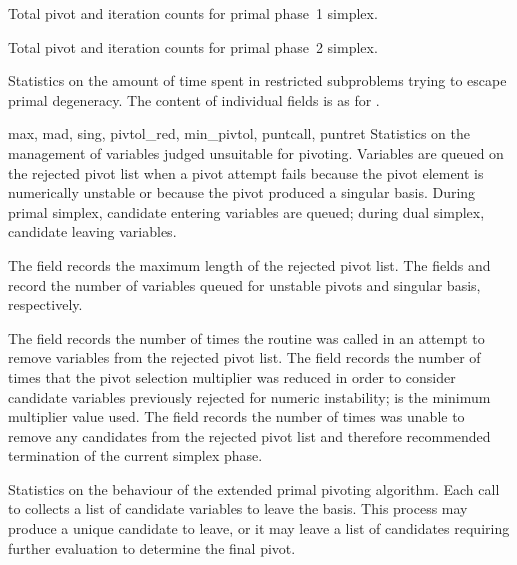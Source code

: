 \begin{codedoc}
  \item{}
  Total pivot and iteration counts for primal phase~1 simplex.

  \item{}
  Total pivot and iteration counts for primal phase~2 simplex.

  \item{}
  Statistics on the amount of time spent in restricted subproblems trying to
  escape primal degeneracy.
  The content of individual fields is as for .

  \item{}%
	      {max, mad, sing, pivtol_red, min_pivtol, puntcall, puntret}
  Statistics on the management of variables judged unsuitable for pivoting.
  Variables are queued on the rejected pivot list when a pivot attempt fails
  because the pivot element is numerically unstable or because the pivot
  produced a singular basis.
  During primal simplex, candidate entering variables are queued; during dual
  simplex, candidate leaving variables.

  The  field records the maximum length of the rejected pivot list.
  The fields  and  record the number of variables
  queued for unstable pivots and singular basis, respectively.

  The  field records the number of times the routine
   was called in an attempt to remove variables from the
  rejected pivot list.
  The  field records the number of times that the pivot
  selection multiplier was reduced in order to consider candidate variables
  previously rejected for numeric instability;  is the
  minimum multiplier value used.
  The  field records the number of times 
  was unable to remove any candidates from the rejected pivot list and
  therefore recommended termination of the current simplex phase.

  \item{}
  Statistics on the behaviour of the extended primal pivoting algorithm.
  Each call to  collects a list of candidate variables to
  leave the basis.
  This process may produce a unique candidate to leave, or it may leave a list
  of candidates requiring further evaluation to determine the final pivot.


\end{codedoc}
